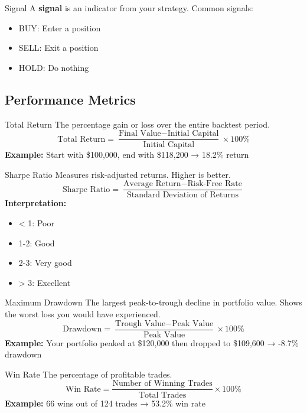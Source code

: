 \documentclass[11pt,a4paper]{article}
\begin{document}
\begin{keyterm}{Signal}
A \textbf{signal} is an indicator from your strategy. Common signals:
\begin{itemize}
  \item BUY: Enter a position
  \item SELL: Exit a position
  \item HOLD: Do nothing
\end{itemize}
\end{keyterm}

\subsection{Performance Metrics}

\begin{keyterm}{Total Return}
The percentage gain or loss over the entire backtest period.
\[
\text{Total Return} = \frac{\text{Final Value} - \text{Initial Capital}}{\text{Initial Capital}} \times 100\%
\]
\textbf{Example:} Start with \$100,000, end with \$118,200 → 18.2\% return
\end{keyterm}

\begin{keyterm}{Sharpe Ratio}
Measures risk-adjusted returns. Higher is better.
\[
\text{Sharpe Ratio} = \frac{\text{Average Return} - \text{Risk-Free Rate}}{\text{Standard Deviation of Returns}}
\]
\textbf{Interpretation:}
\begin{itemize}
  \item < 1: Poor
  \item 1-2: Good
  \item 2-3: Very good
  \item > 3: Excellent
\end{itemize}
\end{keyterm}

\begin{keyterm}{Maximum Drawdown}   
The largest peak-to-trough decline in portfolio value. Shows the worst loss you would have experienced.
\[
\text{Drawdown} = \frac{\text{Trough Value} - \text{Peak Value}}{\text{Peak Value}} \times 100\%
\]
\textbf{Example:} Your portfolio peaked at \$120,000 then dropped to \$109,600 → -8.7\% drawdown
\end{keyterm}

\begin{keyterm}{Win Rate}
The percentage of profitable trades.
\[
\text{Win Rate} = \frac{\text{Number of Winning Trades}}{\text{Total Trades}} \times 100\%
\]
\textbf{Example:} 66 wins out of 124 trades → 53.2\% win rate
\end{keyterm}
\end{document}
